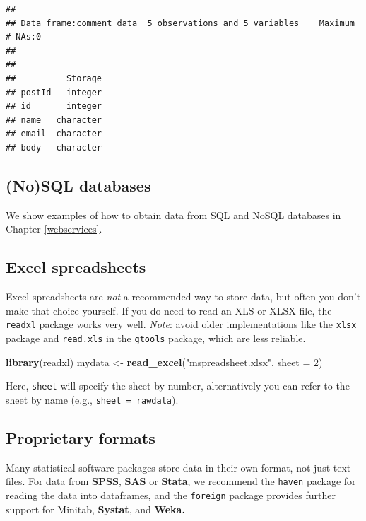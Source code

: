 \documentclass[]{book}
\newenvironment{Shaded}{\begin{snugshade}}{\end{snugshade}}
\newcommand{\DataTypeTok}[1]{\textcolor[rgb]{0.13,0.29,0.53}{#1}}
\newcommand{\DecValTok}[1]{\textcolor[rgb]{0.00,0.00,0.81}{#1}}
\newcommand{\KeywordTok}[1]{\textcolor[rgb]{0.13,0.29,0.53}{\textbf{#1}}}
\newcommand{\NormalTok}[1]{#1}
\newcommand{\StringTok}[1]{\textcolor[rgb]{0.31,0.60,0.02}{#1}}
\begin{document}
\begin{verbatim}
## 
## Data frame:comment_data  5 observations and 5 variables    Maximum # NAs:0
## 
## 
##          Storage
## postId   integer
## id       integer
## name   character
## email  character
## body   character
\end{verbatim}

\hypertarget{nosql-databases}{%
\subsection{(No)SQL databases}\label{nosql-databases}}

We show examples of how to obtain data from SQL and NoSQL databases in Chapter \ref{webservices}.

\hypertarget{excel-spreadsheets}{%
\subsection{Excel spreadsheets}\label{excel-spreadsheets}}

Excel spreadsheets are \emph{not} a recommended way to store data, but often you don't make that choice yourself. If you do need to read an XLS or XLSX file, the \texttt{readxl} package works very well. \emph{Note}: avoid older implementations like the \texttt{xlsx} package and \texttt{read.xls} in the \texttt{gtools} package, which are less reliable.

\begin{Shaded}
\begin{Highlighting}[]
\KeywordTok{library}\NormalTok{(readxl)}
\NormalTok{mydata <-}\StringTok{ }\KeywordTok{read_excel}\NormalTok{(}\StringTok{"mspreadsheet.xlsx"}\NormalTok{, }\DataTypeTok{sheet =} \DecValTok{2}\NormalTok{)}
\end{Highlighting}
\end{Shaded}

Here, \texttt{sheet} will specify the sheet by number, alternatively you can refer to the sheet by name (e.g., \texttt{sheet\ =\ \textquotesingle{}rawdata\textquotesingle{}}).

\hypertarget{proprietary-formats}{%
\subsection{Proprietary formats}\label{proprietary-formats}}

Many statistical software packages store data in their own format, not just text files. For data from \textbf{SPSS}, \textbf{SAS} or \textbf{Stata}, we recommend the \texttt{haven} package for reading the data into dataframes, and the \texttt{foreign} package provides further support for Minitab, \textbf{Systat}, and \textbf{Weka.}
\end{document}
